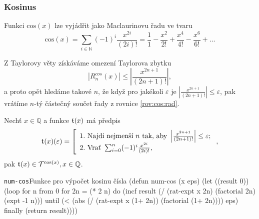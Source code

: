 \subsubsection{Kosinus}
\begin{fact}\label{vet:cos_jako_rada}
Funkci $\mathrm{cos}(x)$ lze vyjádřit jako Maclaurinovu řadu ve tvaru
\begin{equation}\label{rov:cos:rad}
\mathrm{cos}(x) = \sum_{i\in\mathbb{N}}(-1)^i \frac{x^{2i}}{(2i)!} = \frac{1}{1} - \frac{x^2}{2!} + \frac{x^4}{4!} - \frac{x^6}{6!} + \ldots
\end{equation}
\end{fact}

Z Taylorovy věty získáváme omezení Taylorova zbytku
\begin{equation}
|R^{cos}_n(x)|\leq\left|\frac{x^{2n+1}}{(2n+1)!}\right|,
\end{equation}
a proto opět hledáme takové $n$, že když pro jakékoli $\varepsilon$ je $|\frac{x^{2n+1}}{(2n+1)!}|\leq\varepsilon$, pak vrátíme $n$-tý částečný součet řady z rovnice \eqref{rov:cos:rad}.
\begin{consequence} Nechť $x\in\mathbb{Q}$ a funkce $\mathfrak{t}^{}(x)$ má předpis
\begin{equation}
\mathfrak{t}^{}(x)(\varepsilon)=\left[\begin{array}{l}\mathrm{1.~}\text{Najdi~nejmenší~}n\text{~tak,~aby~}\left|\frac{x^{2n+1}}{(2n+1)!}\right| \leq \varepsilon;\\
\mathrm{2.~}\text{Vrať~}\sum_{i=0}^n (-1)^i \frac{x^{2i}}{(2i)!},\end{array}\right.,
\end{equation}
pak $\mathfrak{t}^{}(x)\in\mathcal{T}^{\mathrm{cos}(x)},x\in\mathbb{Q}$.
\end{consequence}\clearpage\begin{lispcode}{\texttt{num-cos}}{Funkce pro výpočet kosinu čísla}
(\textcolor{funkcionalni}{defun} \textcolor{pojmenovan}{num-cos} (x eps)
  (\textcolor{vedlejsi}{let} ((result 0))
    (\textcolor{funkcionalni}{loop} \textcolor{obarvi}{for} n \textcolor{obarvi}{from} 0
          \textcolor{obarvi}{for} 2n = (\textcolor{matematicke}{*} 2 n)
          \textcolor{obarvi}{do} (\textcolor{vedlejsi}{incf} result
                   (\textcolor{matematicke}{/} (\textcolor{moje}{rat-expt} x 2n)
                      (\textcolor{moje}{factorial} 2n)
                      (\textcolor{matematicke}{expt} -1 n)))
          \textcolor{obarvi}{until} (\textcolor{matematicke}{<} (\textcolor{matematicke}{abs} (\textcolor{matematicke}{/} (\textcolor{moje}{rat-expt} x (\textcolor{matematicke}{1+} 2n))
                           (\textcolor{moje}{factorial} (\textcolor{matematicke}{1+} 2n))))
                   eps)
          \textcolor{obarvi}{finally} (\textcolor{funkcionalni}{return} result))))
\end{lispcode}

